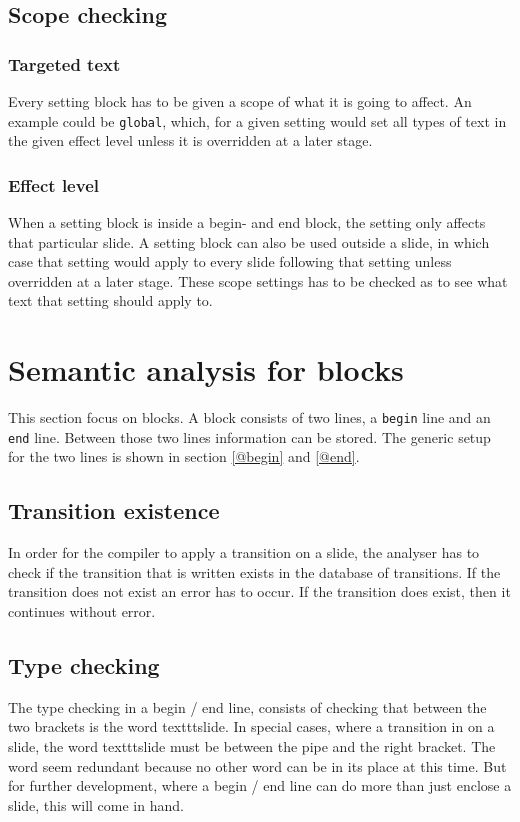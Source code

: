      
\subsection{Scope checking}

\subsubsection*{Targeted text}
Every setting block has to be given a scope of what it is going to affect. An example could be \texttt{global}, which, for a given setting would set all types of text in the given effect level unless it is overridden at a later stage.
\subsubsection*{Effect level}
When a setting block is inside a begin- and end block, the setting only affects that particular slide.
A setting block can also be used outside a slide, in which case that setting would apply to every slide following that setting unless overridden at a later stage. These scope settings has to be checked as to see what text that setting should apply to.

\section{Semantic analysis for blocks}
This section focus on blocks. A block consists of two lines, a \texttt{begin} line and an \texttt{end} line.
Between those two lines information can be stored.
The generic setup for the two lines is shown in section \ref{@begin} and \ref{@end}.

    \subsection{Transition existence}
In order for the compiler to apply a transition on a slide, the analyser has to check if the transition that is written exists in the database of transitions. If the transition does not exist an error has to occur. If the transition does exist, then it continues without error.

    \subsection{Type checking}
The type checking in a begin / end line, consists of checking that between the two brackets is the word texttt{slide}. In special cases, where a transition in on a slide, the word texttt{slide} must be between the pipe and the right bracket. The word seem redundant because no other word can be in its place at this time. But for further development, where a begin / end line can do more than just enclose a slide, this will come in hand.


